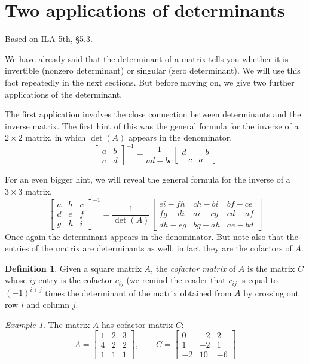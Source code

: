 \documentclass[11pt,oneside]{amsbook}
\theoremstyle{definition}
\theoremstyle{plain}
\theoremstyle{definition}
\newtheorem{definition}[theorem]{Definition}
\theoremstyle{remark}
\newtheorem{example}[theorem]{Example}
\numberwithin{equation}{section}
\numberwithin{figure}{section}
\begin{document}
\newpage
\section{Two applications of determinants}

Based on ILA 5th, \S 5.3.

We have already said that the determinant of a matrix tells you whether it is invertible (nonzero determinant) or singular (zero determinant). We will use this fact repeatedly in the next sections. But before moving on, we give two further applications of the determinant.

The first application involves the close connection between determinants and the inverse matrix. The first hint of this was the general formula for the inverse of a $2\times 2$ matrix, in which $\det(A)$ appears in the denominator.
\[\begin{bmatrix}a&b\\c&d\end{bmatrix}^{-1}
  =\frac{1}{ad-bc}\begin{bmatrix}d&-b\\-c&a\end{bmatrix}
\]

For an even bigger hint, we will reveal the general formula for the inverse of a $3\times 3$ matrix.
\[\begin{bmatrix}a&b&c\\d&e&f\\g&h&i\end{bmatrix}^{-1}
  =\frac{1}{\det(A)}\begin{bmatrix}ei-fh&ch-bi&bf-ce\\fg-di&ai-cg&cd-af\\
  dh-eg&bg-ah&ae-bd\end{bmatrix}
\]
Once again the determinant appears in the denominator. But note also that the entries of the matrix are determinants as well, in fact they are the cofactors of $A$.

\begin{definition}
  Given a square matrix $A$, the \emph{cofactor matrix} of $A$ is the matrix $C$ whose $ij$-entry is the cofactor $c_{ij}$ (we remind the reader that $c_{ij}$ is equal to $(-1)^{i+j}$ times the determinant of the matrix obtained from $A$ by crossing out row $i$ and column $j$.
\end{definition}

\begin{example}
  The matrix $A$ has cofactor matrix $C$:
  \[A=\begin{bmatrix}1&2&3\\4&2&2\\1&1&1\end{bmatrix},\qquad
    C=\begin{bmatrix}0&-2&2\\1&-2&1\\-2&10&-6\end{bmatrix}
  \]
\end{example}  
\end{document}
